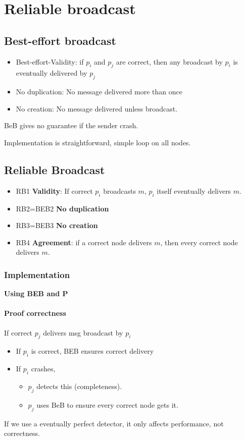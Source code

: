 \section{Reliable broadcast}

\subsection{Best-effort broadcast}

\begin{itemize}
	\item Best-effort-Validity: if $p_i$ and $p_j$ are correct,
	then any broadcast by $p_i$ is eventually delivered by $p_j$
	\item No duplication: No message delivered  more than once
	\item No creation: No message delivered unless broadcast.
\end{itemize}

BeB gives no guarantee if the sender crash.



Implementation is straightforward, simple loop on all nodes.

\subsection{Reliable Broadcast}
\begin{itemize}
	\item RB1 \textbf{Validity}: If correct $p_i$ broadcasts $m$, $p_i$ itself
    eventually delivers $m$.
	\item RB2=BEB2 \textbf{No duplication}
	\item RB3=BEB3 \textbf{No creation}
	\item RB4 \textbf{Agreement}: if a correct node delivers $m$, then every
    correct node delivers $m$.
\end{itemize}

\subsubsection{Implementation}
\textbf{Using BEB and P}

    

\paragraph{Proof correctness}
If correct $p_j$ delivers msg broadcast by $p_i$
\begin{itemize}
	\item If $p_i$ is correct, BEB ensures correct delivery
	\item If $p_i$ crashes,
		\begin{itemize}
			\item $p_j$ detects this (completeness).
			\item $p_j$ uses BeB to ensure every correct node gets it.
		\end{itemize}
\end{itemize}
If we use a eventually perfect detector, it only affects
performance, not correctness.


